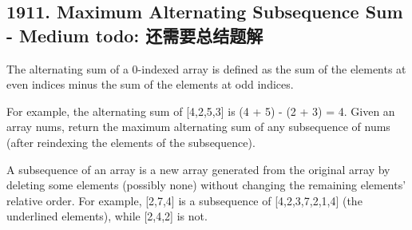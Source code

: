 \documentclass[9pt, b5paaper]{book}
\begin{document}
\subsection{1911. Maximum Alternating Subsequence Sum - Medium todo: 还需要总结题解}
\label{sec-1-4-9}
The alternating sum of a 0-indexed array is defined as the sum of the elements at even indices minus the sum of the elements at odd indices.

For example, the alternating sum of [4,2,5,3] is (4 + 5) - (2 + 3) = 4.
Given an array nums, return the maximum alternating sum of any subsequence of nums (after reindexing the elements of the subsequence).

A subsequence of an array is a new array generated from the original array by deleting some elements (possibly none) without changing the remaining elements' relative order. For example, [2,7,4] is a subsequence of [4,2,3,7,2,1,4] (the underlined elements), while [2,4,2] is not.
\end{document}
